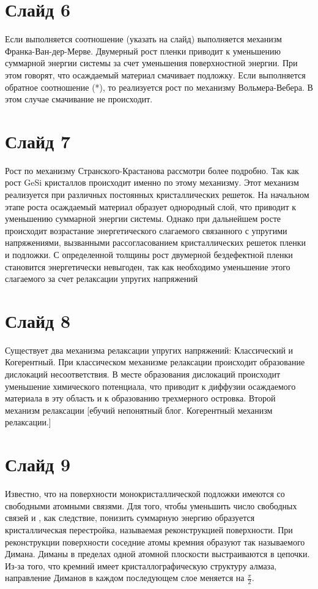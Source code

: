 \section*{Слайд 6}
Если выполняется соотношение (указать на слайд) выполняется механизм Франка-Ван-дер-Мерве. Двумерный рост пленки приводит к уменьшению суммарной энергии системы за счет уменьшения поверхностной энергии. При этом говорят, что осаждаемый материал смачивает подложку. Если выполняется обратное соотношение (*), то реализуется рост по механизму Вольмера-Вебера. В этом случае смачивание не происходит. 

\section*{Слайд 7}
Рост по механизму Странского-Крастанова рассмотри более подробно. Так как рост GeSi кристаллов происходит именно по этому механизму. Этот механизм реализуется при различных постоянных кристаллических решеток. На начальном этапе роста осаждаемый материал образует однородный слой, что приводит к уменьшению суммарной энергии системы. Однако при дальнейшем росте происходит возрастание энергетического слагаемого связанного с упругими напряжениями, вызванными рассогласованием кристаллических решеток пленки и подложки. С определенной толщины рост двумерной бездефектной пленки становится энергетически невыгоден, так как необходимо уменьшение этого слагаемого за счет релаксации упругих напряжений

\section*{Слайд 8}
Существует два механизма релаксации упругих напряжений: Классический и Когерентный.
При классическом механизме релаксации происходит образование дислокаций несоответствия. В месте образования дислокаций происходит уменьшение химического потенциала, что приводит к диффузии осаждаемого материала в эту область и к образованию трехмерного островка. Второй механизм релаксации [ебучий непонятный блог. Когерентный механизм релаксации.]

\section*{Слайд 9}
Известно, что на поверхности монокристаллической подложки имеются со свободными атомными связями. Для того, чтобы уменьшить число свободных связей и , как следствие, понизить суммарную энергию образуется кристаллическая перестройка, называемая реконструкцией поверхности. При реконструкции поверхности соседние атомы кремния
образуют так называемого Димана. Диманы в пределах одной атомной плоскости выстраиваются в цепочки. Из-за того, что кремний имеет кристаллографическую структуру алмаза, направление Диманов в каждом последующем слое меняется на $\frac{\pi}{2}$.

